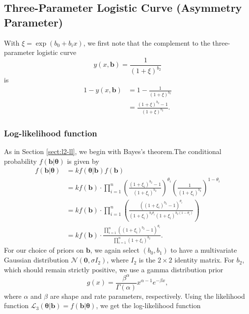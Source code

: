 \documentclass[11pt, letterpaper]{article}
\newcommand{\mc}[1]{\mathcal{#1}}
\begin{document}
\subsection{Three-Parameter Logistic Curve (Asymmetry Parameter)}
With $\xi = \exp(b_0 + b_i x)$, we first note that the complement to the three-parameter logistic curve $$y(x, \bm b) = \frac{1}{(1+\xi)^{b_2}} $$ is 
\begin{align*}
1 - y(x, \bm b) & = 1- \frac{1}{(1+\xi)^{b_2}} \\
& = \frac{(1+\xi)^{b_2} -1}{(1+\xi)^{b_2}}.
\end{align*}

\subsubsection{Log-likelihood function}
As in Section \ref{sect:l2-ll}, we begin with Bayes's theorem.The conditional probability $f(\bm b | \bm \theta)$ is given by
\begin{align*}
f(\bm b | \bm \theta) &= k f(\bm \theta | \bm b) f(\bm b) \\
&= k f(\bm b) \cdot \prod_{i=1}^n \left( \frac{(1+\xi_i)^{b_2} - 1}{(1+\xi_i)^{b_2}}\right)^{\theta_i}\left( \frac{1}{(1+\xi_i)^{b_2}}\right)^{1-\theta_i}\\
&= kf(\bm b) \cdot \prod_{i=1}^n \left( \frac{\left((1+\xi_i)^{b_2}-1 \right)^{ \theta_i}}{\left(1+\xi_i\right)^{b_2\theta_i}\left(1+\xi_i\right)^{b_2(1-\theta_i)}}\right)\\
&=k f(\bm b) \cdot  \frac{\prod_{i=1}^n \left( (1+\xi_i)^{b_2}-1 \right)^{\theta_i}}{\prod_{i=1}^n (1+\xi_i)^{b_2}}.
\end{align*}
For our choice of priors on $\bm b$, we again select $(b_0, b_1)$ to have a multivariate Gaussian distribution $\mc N(\bm 0, \sigma I_2)$, where $I_2$ is the $2 \times 2$ identity matrix. For $b_2$, which should remain strictly positive, we use a gamma distribution prior $$ g(x) = \frac{\beta^\alpha}{\Gamma(\alpha)} x^{\alpha-1}e^{-\beta x},$$
where  $\alpha$ and $\beta$ are shape and rate parameters, respectively.
Using the likelihood function $\mc L_3(\bm \theta | \bm b) = f(\bm b | \bm \theta)$, we get the log-likelihood function
\end{document}
